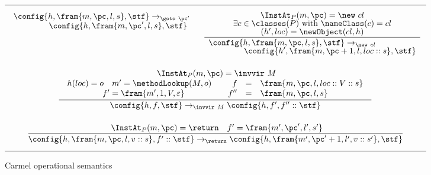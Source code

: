 \begin{figure}[htbp]
\begin{center}
\begin{tabular}[c]{cc}
\begin{minipage}[c]{6cm}
$${\begin{array}[t]{l}\config{h,\fram{m,\pc,l,s},\stf} \to_{\goto\ \pc'}\\
\spp \config{h,\fram{m,\pc',l,s},\stf}\end{array}}$$
\end{minipage}
&
\begin{minipage}[c]{6cm}  \footnotesize
$$\frac{%
{\renewcommand{\arraystretch}{0.7} \begin{array}[c]{c}
\ \InstAt_P(m,\pc)=\new\ cl\ \\
\exists c\in\classes(P)\text{ with } \nameClass(c)=cl \\
\left(h',loc\right)=\newObject(cl,h)
\end{array}}}%
{\begin{array}[t]{l}\config{h,\fram{m,\pc,l,s},\stf} \to_{\new\ cl}\\
\spp \config{h',\fram{m,\pc+1,l,loc::s},\stf}\end{array}}$$
\end{minipage}

\\

\multicolumn{2}{c}{
\begin{minipage}[c]{10cm}  \footnotesize
$$\frac{
{\renewcommand{\arraystretch}{1} 
\begin{array}[c]{c}
\ \InstAt_{P}(m,\pc)=\invvir\ M\\
\begin{array}[c]{crcl}
h(loc) = o \quad m'= \methodLookup(M, o)\quad &
f &=&  \fram{m,\pc,l,loc::V::s} \\
f'=\fram{m',1,V,\varepsilon}
& f'' &=& \fram{m,\pc,l,s}
\end{array}
\end{array}}}
{ \begin{array}[t]{c}
\config{h,f,\stf} \to_{\invvir\ M}
\config{h,f',f''::\stf}
\end{array}}
$$
\end{minipage}}

\\

\multicolumn{2}{c}{\begin{minipage}[c]{10cm}  \footnotesize
$$
\frac{
{\renewcommand{\arraystretch}{0.7} \begin{array}[c]{c}
\ \InstAt_{P}(m,\pc)=\return 
 \quad  f'=\fram{m',\pc',l',s'}
\end{array}}}%
{
\config{h,\fram{m,\pc,l,v::s},f'::\stf} \to_{\return}
\config{h,\fram{m',\pc'+1,l',v::s'},\stf}
}$$
\end{minipage}}

\end{tabular}
    
    \caption{Carmel operational semantics}
    \label{fig:sem}
  \end{center}
\end{figure}


